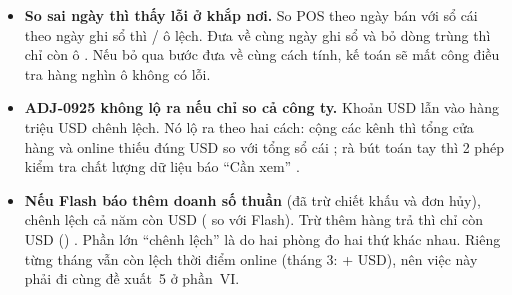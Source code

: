 \begin{itemize}
  \item \textbf{So sai ngày thì thấy lỗi ở khắp nơi.} So POS theo ngày bán với sổ cái theo ngày ghi sổ thì \SoOLechNgayBanNam{}/\SoOCuaHang{} ô lệch. Đưa về cùng ngày ghi sổ và bỏ dòng trùng thì chỉ còn \SoOCuaHangLech{} ô . Nếu bỏ qua bước đưa về cùng cách tính, kế toán sẽ mất công điều tra hàng nghìn ô không có lỗi.
  \item \textbf{ADJ-0925 không lộ ra nếu chỉ so cả công ty.} Khoản \SoChuaGanKenh{} USD lẫn vào hàng triệu USD chênh lệch. Nó lộ ra theo hai cách: cộng các kênh thì tổng cửa hàng và online thiếu đúng \SoChuaGanKenh{} USD so với tổng sổ cái ; rà bút toán tay thì 2 phép kiểm tra chất lượng dữ liệu báo ``Cần xem'' .
  \item \textbf{Nếu Flash báo thêm doanh số thuần} (đã trừ chiết khấu và đơn hủy), chênh lệch cả năm còn \SoFlashThuanConLai{} USD (\SoFlashThuanPct{} so với Flash). Trừ thêm hàng trả thì chỉ còn \SoFlashThuanTraConLai{} USD (\SoFlashThuanTraPct{}) . Phần lớn ``chênh lệch'' là do hai phòng đo hai thứ khác nhau. Riêng từng tháng vẫn còn lệch thời điểm online (tháng 3: +\SoLechOnlineMax{} USD), nên việc này phải đi cùng đề xuất~5 ở phần~VI.
\end{itemize}
